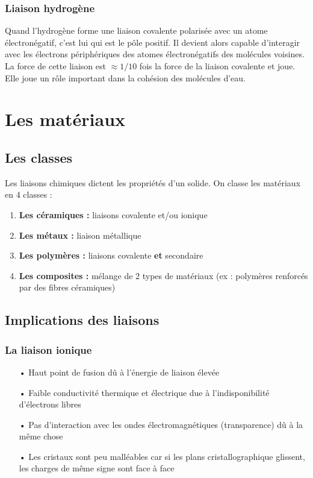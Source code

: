 		\subsubsection{Liaison hydrogène}
			Quand l'hydrogène forme une liaison covalente polarisée avec un atome électronégatif, c'est lui qui est le pôle positif. Il devient alors capable d'interagir avec les électrons périphériques des atomes électronégatifs des molécules voisines. \\
			La force de cette liaison est $\approx 1/10$ fois la force de la liaison covalente et joue. Elle joue un rôle important dans la cohésion des molécules d'eau.
			
\section{Les matériaux}
	\subsection{Les classes}
		Les liaisons chimiques dictent les propriétés d'un solide. On classe les matériaux en 4 classes :
	
		\begin{enumerate}
			\item \textbf{Les céramiques :} liaisons covalente et/ou ionique
			\item \textbf{Les métaux :} liaison métallique
			\item \textbf{Les polymères :} liaisons covalente \textbf{et} secondaire
			\item \textbf{Les composites :} mélange de 2 types de matériaux (ex : polymères renforcés par des fibres céramiques)
		\end{enumerate}	 
	
	\subsection{Implications des liaisons}
		\subsubsection{La liaison ionique}
			\begin{itemize}
				\item[•] Haut point de fusion dû à l'énergie de liaison élevée
				\item[•] Faible conductivité thermique et électrique due à l'indisponibilité d'électrons libres
				\item[•] Pas d'interaction avec les ondes électromagnétiques (transparence) dû à la même chose
				\item[•] Les cristaux sont peu malléables car si les plans cristallographique glissent, les charges de même signe sont face à face
			\end{itemize}					
			
